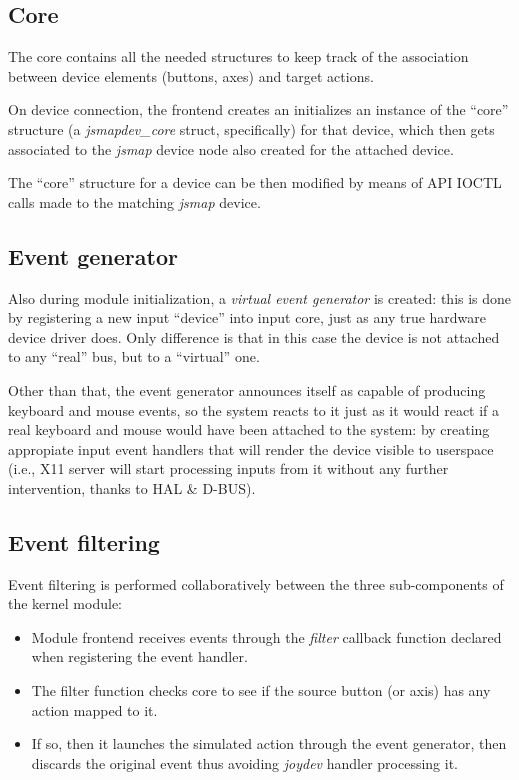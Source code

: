 \subsection{Core}
The core contains all the needed structures to keep track of the association between device elements (buttons, axes) and target actions.

On device connection, the frontend creates an initializes an instance of the ``core'' structure (a \emph{jsmapdev\_core} struct, specifically) for that device, which then gets associated to the \emph{jsmap} device node also created for the attached device. 

The ``core'' structure for a device can be then modified by means of API IOCTL calls made to the matching \emph{jsmap} device.


\subsection{Event generator}
Also during module initialization, a \emph{virtual event generator} is created: this is done by registering a new input ``device'' into input core, just as any true hardware device driver does. Only difference is that in this case the device is not attached to any ``real'' bus, but to a ``virtual'' one.

Other than that, the event generator announces itself as capable of producing keyboard and mouse events, so the system reacts to it just as it would react if a real keyboard and mouse would have been attached to the system: by creating appropiate input event handlers that will render the device visible to userspace (i.e., X11 server will start processing inputs from it without any further intervention, thanks to HAL \& D-BUS).


\subsection{Event filtering}
Event filtering is performed collaboratively between the three sub-components of the kernel module:
\begin{itemize}
 \item Module frontend receives events through the \emph{filter} callback function declared when registering the event handler.
 \item The filter function checks core to see if the source button (or axis) has any action mapped to it.
 \item If so, then it launches the simulated action through the event generator, then discards the original event thus avoiding \emph{joydev} handler processing it. 
\end{itemize}

